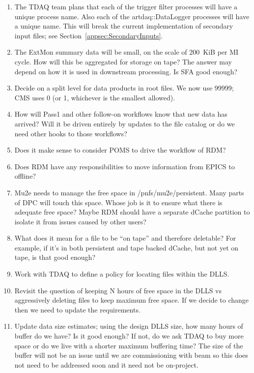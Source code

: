 \begin{enumerate}
\item The TDAQ team plans that each of the trigger filter processes will have a unique process name.
  Also each of the {\code artdaq::DataLogger} processes will have a unique name.
  This will break the current \art implementation of secondary input files; see Section~\ref{appsec:SecondaryInputs}.
\item The ExtMon summary data will be small, on the scale of 200~KiB per MI cycle.  How will this be aggregated for storage on tape?
  The answer may depend on how it is used in downstream processing.  Is SFA good enough?
\item Decide on a split level for data products in \art root files.  We now use 99999; CMS uses 0 (or 1, whichever is the smallest allowed).
\item How will Pass1 and other follow-on workflows know that new data has arrived?
  Will it be driven entirely by updates to the file catalog or do we need other
  hooks to those workflows?
\item Does it make sense to consider POMS to drive the workflow of RDM?
\item Does RDM have any responsibilities to move information from EPICS to offline?
\item Mu2e needs to manage the free space in /pnfs/mu2e/persistent. Many parts of DPC will touch this space.
  Whose job is it to ensure what there is adequate free space? Maybe RDM should have a separate dCache
  partition to isolate it from issues caused by other users?
\item What does it mean for a file to be ``on tape'' and therefore deletable?
  For example, if it's in both persistent and tape backed dCache, but not yet on tape, is that good enough?
\item Work with TDAQ to define a policy for locating files within the DLLS.
\item Revisit the question of keeping N hours of free space in the DLLS vs aggressively deleting files to keep
  maximum free space.  If we decide to change then we need to update the requirements.
\item Update data size estimates; using the design DLLS size, how many hours of buffer do we have?  Is it good enough?
  If not, do we ask TDAQ to buy more space or do we live with a shorter maximum buffering time?
  The size of the buffer will not be an issue until we are commissioning with beam so this does not need to
  be addressed soon and it need not be on-project.

\end{enumerate}
